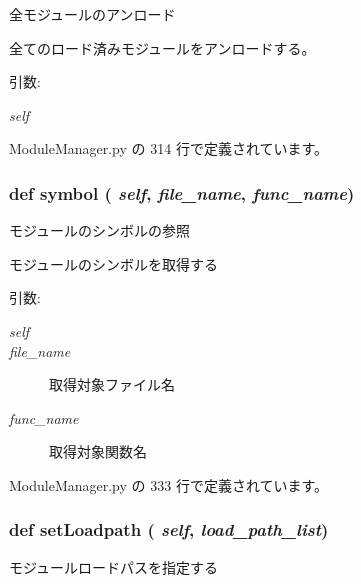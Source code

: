 全モジュールのアンロード 

全てのロード済みモジュールをアンロードする。

\begin{Desc}
\item[引数:]
\begin{description}
\item[{\em self}]\end{description}
\end{Desc}


 ModuleManager.py の 314 行で定義されています。
\subsubsection{\setlength{\rightskip}{0pt plus 5cm}def symbol ( {\em self},  {\em file\_\-name},  {\em func\_\-name})}\label{classsource__py_1_1_module_manager_1_1_module_manager_312c55479750c2b9660e9d3c394caf27}


モジュールのシンボルの参照 

モジュールのシンボルを取得する

\begin{Desc}
\item[引数:]
\begin{description}
\item[{\em self}]\item[{\em file\_\-name}]取得対象ファイル名 \item[{\em func\_\-name}]取得対象関数名 \end{description}
\end{Desc}


 ModuleManager.py の 333 行で定義されています。
\subsubsection{\setlength{\rightskip}{0pt plus 5cm}def setLoadpath ( {\em self},  {\em load\_\-path\_\-list})}\label{classsource__py_1_1_module_manager_1_1_module_manager_69ccf19991223942f13c02cb1f9c982c}


モジュールロードパスを指定する 

